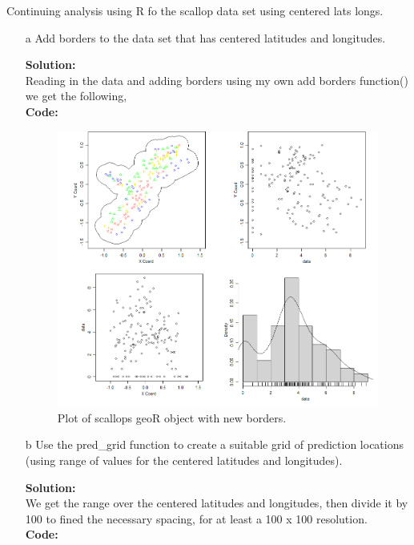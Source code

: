 \documentclass[12pt]{article}
\makeatletter
\theoremstyle{homework}
\newenvironment{exercise}[1]
{\def\@currentlabel{#1}\exercisecore}
{\endexercisecore}
\newcommand{\localhead}[1]{\par\smallskip\noindent\textbf{#1}\nobreak\\}%
\newcommand\solution{\localhead{Solution:}}
\makeatother
\begin{document}
\begin{exercise}{2} Continuing analysis using R fo the scallop data set using centered lats longs.
  
  \begin{enumerate}
    \item[a] Add borders to the data set that has centered latitudes and longitudes.
    \solution Reading in the data and adding borders using my own add borders function() we get the following, \\
        \textbf{Code:}
      \begin{center}
      
      \end{center}
      \begin{figure}[H]
        \begin{center}
          \caption{Plot of scallops geoR object with new borders.}
        \includegraphics[width = .75\textwidth]{Rplot01.png}
        \end{center}
      \end{figure}

      \vspace{.15in}
   
    \item[b] Use the pred\_grid function to create a suitable grid of prediction locations (using range 
    of values for the centered latitudes and longitudes).\\ 
    \solution We get the range over the centered latitudes and longitudes, then divide it by 100 to fined the necessary spacing, for 
    at least a 100 x 100 resolution. \\
    \textbf{Code:}
    \begin{center}
    
    \end{center}
    \vspace{.15in}





\end{enumerate}
\end{exercise}
\end{document}
